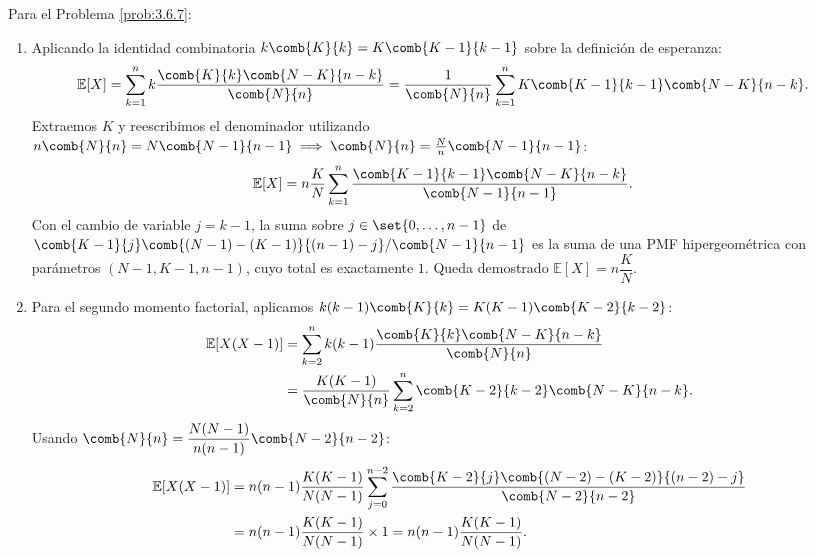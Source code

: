 \begin{solucion}
	\label{sol:3.6.7}
	Para el Problema \ref{prob:3.6.7}:
	\begin{enumerate}
		\item Aplicando la identidad combinatoria $k \comb{K}{k} = K \comb{K-1}{k-1}$ sobre la definición de esperanza:
		\begin{align*}
			\mathbb{E}[X] &= \sum_{k=1}^n k \dfrac{\comb{K}{k}\comb{N-K}{n-k}}{\comb{N}{n}} = \dfrac{1}{\comb{N}{n}} \sum_{k=1}^n K \comb{K-1}{k-1}\comb{N-K}{n-k}.
		\end{align*}
		Extraemos $K$ y reescribimos el denominador utilizando $n \comb{N}{n} = N \comb{N-1}{n-1} \implies \comb{N}{n} = \frac{N}{n} \comb{N-1}{n-1}$:
		\begin{align*}
			\mathbb{E}[X] &= n \dfrac{K}{N} \sum_{k=1}^n \dfrac{\comb{K-1}{k-1}\comb{N-K}{n-k}}{\comb{N-1}{n-1}}.
		\end{align*}
		Con el cambio de variable $j = k-1$, la suma sobre $j \in \set{0, \dots, n-1}$ de $\comb{K-1}{j}\comb{(N-1)-(K-1)}{(n-1)-j}/\comb{N-1}{n-1}$ es la suma de una PMF hipergeométrica con parámetros $(N-1, K-1, n-1)$, cuyo total es exactamente $1$. Queda demostrado $\mathbb{E}[X] = n \dfrac{K}{N}$.
		\item Para el segundo momento factorial, aplicamos $k(k-1)\comb{K}{k} = K(K-1)\comb{K-2}{k-2}$:
		\begin{align*}
			\mathbb{E}[X(X-1)] &= \sum_{k=2}^n k(k-1) \dfrac{\comb{K}{k}\comb{N-K}{n-k}}{\comb{N}{n}} \\
			&= \dfrac{K(K-1)}{\comb{N}{n}} \sum_{k=2}^n \comb{K-2}{k-2}\comb{N-K}{n-k}.
		\end{align*}
		Usando $\comb{N}{n} = \dfrac{N(N-1)}{n(n-1)}\comb{N-2}{n-2}$:
		\begin{align*}
			\mathbb{E}[X(X-1)] &= n(n-1)\dfrac{K(K-1)}{N(N-1)} \sum_{j=0}^{n-2} \dfrac{\comb{K-2}{j}\comb{(N-2)-(K-2)}{(n-2)-j}}{\comb{N-2}{n-2}} \\
			&= n(n-1)\dfrac{K(K-1)}{N(N-1)} \times 1 = n(n-1)\dfrac{K(K-1)}{N(N-1)}.
		\end{align*}
	\end{enumerate}
\end{solucion}

